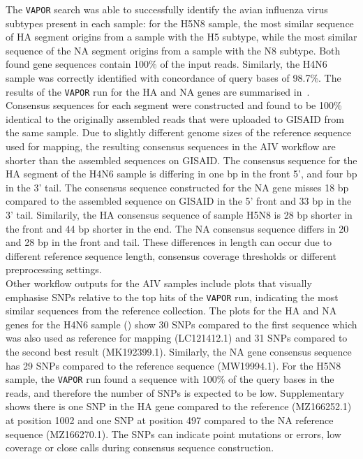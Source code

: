 The \texttt{VAPOR} search was able to successfully identify the avian influenza virus subtypes present in each sample: for the H5N8 sample, the most similar sequence of HA segment origins from a sample with the H5 subtype, while the most similar sequence of the NA segment origins from a sample with the N8 subtype. Both found gene sequences contain 100\% of the input reads. Similarly, the H4N6 sample was correctly identified with concordance of query bases of 98.7\%. The results of the \texttt{VAPOR} run for the HA and NA genes are summarised in~. \\
Consensus sequences for each segment were constructed and found to be 100\% identical to the originally assembled reads that were uploaded to \ac{GISAID} from the same sample. Due to slightly different genome sizes of the reference sequence used for mapping, the resulting consensus sequences in the \ac{AIV} workflow are shorter than the assembled sequences on \ac{GISAID}. The consensus sequence for the \ac{HA} segment of the H4N6 sample is differing in one bp in the front 5', and four bp in the 3' tail. The consensus sequence constructed for the \ac{NA} gene misses 18 bp compared to the assembled sequence on \ac{GISAID} in the 5' front and 33 bp in the 3' tail. Similarily, the \ac{HA} consensus sequence of sample H5N8 is 28 bp shorter in the front and 44 bp shorter in the end. The \ac{NA} consensus sequence differs in 20 and 28 bp in the front and tail. These differences in length can occur due to different reference sequence length, consensus coverage thresholds or different preprocessing settings. \\
Other workflow outputs for the \ac{AIV} samples include plots that visually emphasise \acp{SNP} relative to the top hits of the \texttt{VAPOR} run, indicating the most similar sequences from the reference collection. The plots for the \ac{HA} and \ac{NA} genes for the H4N6 sample () show 30 \acp{SNP} compared to the first sequence which was also used as reference for mapping (LC121412.1) and 31 \acp{SNP} compared to the second best result (MK192399.1). Similarly, the \ac{NA} gene consensus sequence has 29 \acp{SNP} compared to the reference sequence (MW19994.1). For the H5N8 sample, the \texttt{VAPOR} run found a sequence with 100\% of the query bases in the reads, and therefore the number of \acp{SNP} is expected to be low. Supplementary~ shows there is one \ac{SNP} in the \ac{HA} gene compared to the reference (MZ166252.1) at position 1002 and one \ac{SNP} at position 497 compared to the \ac{NA} reference sequence (MZ166270.1). The \acp{SNP} can indicate point mutations or errors, low coverage or close calls during consensus sequence construction. \\
